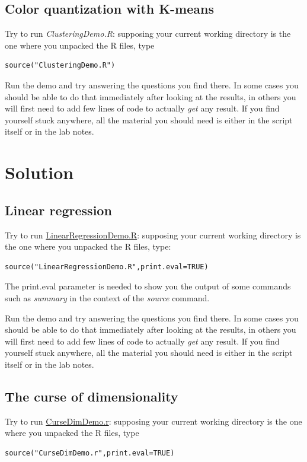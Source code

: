 \documentclass[a4paper,12pt,titlepage]{article} %
\begin{document}
\subsection{Color quantization with K-means}
Try to run \textit{ClusteringDemo.R}: supposing your current working directory is the one where you unpacked the R files, type
\begin{verbatim}
source("ClusteringDemo.R")
\end{verbatim}

Run the demo and try answering the questions you find there. In some cases you should be able to do that immediately after looking at the results, in others you will first need to add few lines of code to actually \textit{get} any result. If you find yourself stuck anywhere, all the material you should need is either in the script itself or in the lab notes.

\newpage
\section{Solution}
\subsection{Linear regression}
Try to run \underline{LinearRegressionDemo.R}: supposing your current working directory is the one where you unpacked the R files, type:
\begin{verbatim}
source("LinearRegressionDemo.R",print.eval=TRUE)
\end{verbatim}

The print.eval parameter is needed to show you the output of some commands such as \textit{summary} in the context of the \textit{source} command.

Run the demo and try answering the questions you find there. In some cases you should be able to do that immediately after looking at the results, in others you will first need to add few lines of code to actually \textit{get} any result. If you find yourself stuck anywhere, all the material you should need is either in the script itself or in the lab notes.

\newpage
\subsection{The curse of dimensionality}
Try to run \underline{CurseDimDemo.r}: supposing your current working directory is the one where you unpacked the R files, type
\begin{verbatim}
source("CurseDimDemo.r",print.eval=TRUE)
\end{verbatim}
\end{document}
